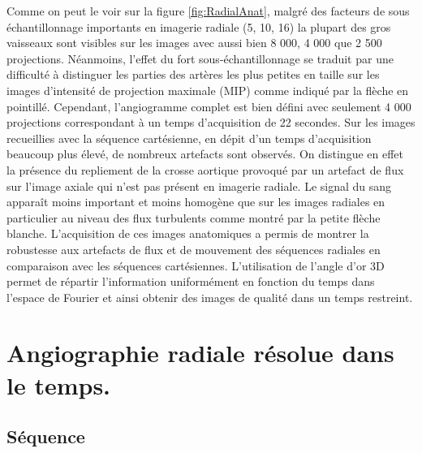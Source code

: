 Comme on peut le voir sur la figure \ref{fig:RadialAnat}, malgré des facteurs de sous échantillonnage importants en imagerie radiale (5, 10, 16) la plupart des gros vaisseaux sont visibles sur les images avec aussi bien 8 000, 4 000 que 2 500 projections. Néanmoins, l’effet du fort sous-échantillonnage se traduit par une difficulté à distinguer les parties des artères les plus petites en taille sur les images d’intensité de projection maximale (MIP) comme indiqué par la flèche en pointillé. Cependant, l’angiogramme complet est bien défini avec seulement 4 000 projections correspondant à un temps d’acquisition de 22 secondes. 
Sur les images recueillies avec la séquence cartésienne, en dépit d’un temps d’acquisition beaucoup plus élevé, de nombreux artefacts sont observés. On distingue en effet la présence du repliement de la crosse aortique provoqué par un artefact de flux sur l’image axiale qui n’est pas présent en imagerie radiale. Le signal du sang apparaît moins important et moins homogène que sur les images radiales en particulier au niveau des flux turbulents comme montré par la petite flèche blanche.
L’acquisition de ces images anatomiques a permis de montrer la robustesse aux artefacts de flux et de mouvement des séquences radiales en comparaison avec les séquences cartésiennes.  
L’utilisation de l’angle d’or 3D permet de répartir l’information uniformément en fonction du temps dans l’espace de Fourier et ainsi obtenir des images de qualité dans un temps restreint.

\section{Angiographie radiale résolue dans le temps.}

\subsection{Séquence}

